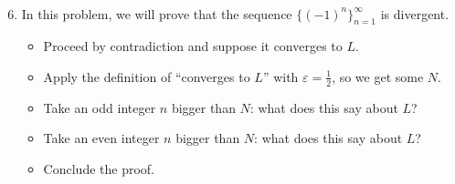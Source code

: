 \documentclass[12pt]{amsart}
\newcommand{\e}{\varepsilon}
\begin{document}
\

\begin{enumerate}\setcounter{enumi}{5}
\item In this problem, we will prove that the sequence $\{ (-1)^{n} \}_{n=1}^\infty$ is divergent.

\begin{itemize}
\item Proceed by contradiction and suppose it converges to $L$.
\item Apply the definition of ``converges to $L$'' with $\e = \frac{1}{2}$, so we get some $N$.
\item Take an odd integer $n$ bigger than $N$: what does this say about $L$?
\item  Take an even integer $n$ bigger than $N$: what does this say about $L$?
\item Conclude the proof.
\end{itemize}
\end{enumerate}
\end{document}
